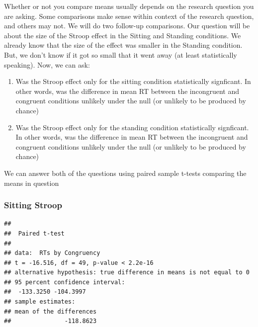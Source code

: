 \documentclass[]{book}
\newenvironment{Shaded}{\begin{snugshade}}{\end{snugshade}}
\newcommand{\KeywordTok}[1]{\textcolor[rgb]{0.13,0.29,0.53}{\textbf{#1}}}
\newcommand{\DataTypeTok}[1]{\textcolor[rgb]{0.13,0.29,0.53}{#1}}
\newcommand{\StringTok}[1]{\textcolor[rgb]{0.31,0.60,0.02}{#1}}
\newcommand{\OtherTok}[1]{\textcolor[rgb]{0.56,0.35,0.01}{#1}}
\newcommand{\OperatorTok}[1]{\textcolor[rgb]{0.81,0.36,0.00}{\textbf{#1}}}
\newcommand{\NormalTok}[1]{#1}
\begin{document}
Whether or not you compare means usually depends on the research
question you are asking. Some comparisons make sense within context of
the research question, and others may not. We will do two follow-up
comparisons. Our question will be about the size of the Stroop effect in
the Sitting and Standing conditions. We already know that the size of
the effect was smaller in the Standing condition. But, we don't know if
it got so small that it went away (at least statistically speaking).
Now, we can ask:

\begin{enumerate}
\def\labelenumi{\arabic{enumi}.}
\item
  Was the Stroop effect only for the sitting condition statistically
  signficant. In other words, was the difference in mean RT between the
  incongruent and congruent conditions unlikely under the null (or
  unlikely to be produced by chance)
\item
  Was the Stroop effect only for the standing condition statistically
  signficant. In other words, was the difference in mean RT between the
  incongruent and congruent conditions unlikely under the null (or
  unlikely to be produced by chance)
\end{enumerate}

We can answer both of the questions using paired sample t-tests
comparing the means in question

\subsubsection{Sitting Stroop}\label{sitting-stroop}

\begin{Shaded}
\end{Shaded}

\begin{verbatim}
## 
##  Paired t-test
## 
## data:  RTs by Congruency
## t = -16.516, df = 49, p-value < 2.2e-16
## alternative hypothesis: true difference in means is not equal to 0
## 95 percent confidence interval:
##  -133.3250 -104.3997
## sample estimates:
## mean of the differences 
##               -118.8623
\end{verbatim}
\end{document}
